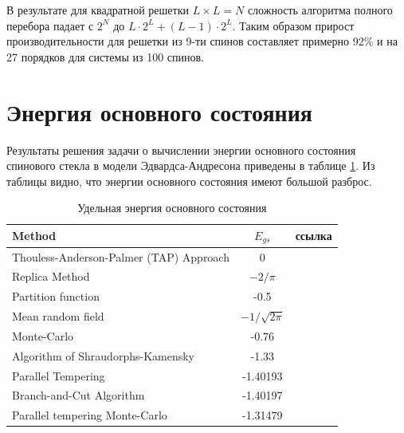 \documentclass[utf8, babel, sor, jor, amsmath, amssymb, reprint]{elsarticle} %
\begin{document}
В результате для квадратной решетки $L \times L=N$ сложность алгоритма полного перебора падает с $2^{N}$ до $L \cdot 2^L + (L - 1) \cdot 2^L$. Таким образом прирост производительности для решетки из 9-ти спинов составляет примерно 92\% и на 27 порядков для системы из 100 спинов.


\section{Энергия основного состояния}

Результаты решения задачи о вычислении энергии основного состояния спинового стекла в модели Эдвардса-Андресона приведены в таблице \ref{tab:Egs}. Из таблицы видно, что энергии основного состояния  имеют большой разброс.

\begin{table}[h]
	\begin{tabular}{|l|c|l|}
		\hline
		Method                                   & $E_{gs}$                                       & ссылка                                          \\ \hline
		Thouless-Anderson-Palmer (TAP) Approach & 0                                              & \cite{thouless1977solution}    \\ \hline
		Replica Method                            & $-2/\pi$                                       & \cite{sherrington1975solvable} \\ \hline
		Partition function                      & -0.5                                           & \cite{tanaka1980analytic}      \\ \hline
		Mean random field                       & $-1/\sqrt{2\pi}$                               & \cite{klein1976comparison}     \\ \hline
		Monte-Carlo                             & -0.76                                          & \cite{kirkpatrick1978infinite} \\ \hline
		Algorithm of Shraudorphs-Kamensky        & -1.33                                          & \cite{karandashev2019global}   \\ \hline
		Parallel Tempering   & -1.40193                                       & \cite{palmer1999ground}        \\ \hline
		Branch-and-Cut Algorithm              & -1.40197                         
		& \cite{campbell2004energy}      \\ \hline
		
		Parallel tempering Monte-Carlo  & -1.31479                                       & \cite{roma2009ground}          \\ \hline
		
		
		
	\end{tabular}
	\label{tab:Egs}
	\caption{Удельная энергия основного состояния}
\end{table}
\end{document}
